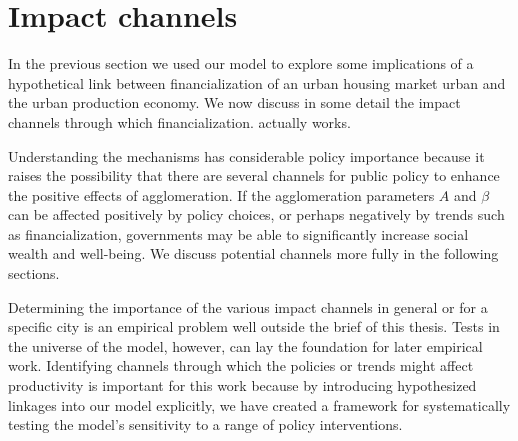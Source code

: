 





\section{Impact channels}
In the previous  section we  used our model to explore some  implications of a hypothetical link between financialization of an urban housing market urban and the urban production economy. We now discuss in some detail the impact channels through which financialization. actually works. 

Understanding the mechanisms has considerable policy importance because it raises the possibility that there are several channels for public policy to enhance the positive effects of agglomeration. If the agglomeration parameters $A$ and  $\beta$ can be affected positively by policy choices, or perhaps negatively by trends such as financialization,  governments may be able to significantly increase social wealth and well-being. We discuss potential channels more fully in the following sections. 

Determining the importance of the various impact channels in general or for a specific city is an empirical problem well outside the brief of this thesis. Tests in the universe of the model, however, can lay the foundation for later empirical work. Identifying channels through which the policies or trends might affect productivity is important for this work because by introducing hypothesized linkages into our model explicitly, we have created a framework for systematically testing the model's sensitivity to a range of policy interventions. 

